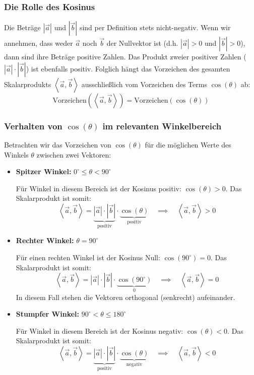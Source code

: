 \subsubsection*{Die Rolle des Kosinus}
Die Beträge $|\vec{a}|$ und $|\vec{b}|$ sind per Definition stets nicht-negativ. Wenn wir annehmen,
dass weder $\vec{a}$ noch $\vec{b}$ der Nullvektor ist (d.h. $|\vec{a}| > 0$ und $|\vec{b}| > 0$), dann
sind ihre Beträge positive Zahlen.
Das Produkt zweier positiver Zahlen ($|\vec{a}| \cdot |\vec{b}|$) ist ebenfalls positiv.
Folglich hängt das Vorzeichen des gesamten Skalarprodukts $\left\langle \vec{a}, \vec{b} \right\rangle$
ausschließlich vom Vorzeichen des Terms $\cos(\theta)$ ab:
$$ \text{Vorzeichen}(\left\langle \vec{a}, \vec{b} \right\rangle) = \text{Vorzeichen}(\cos(\theta)) $$

\subsubsection*{Verhalten von $\cos(\theta)$ im relevanten Winkelbereich}
Betrachten wir das Vorzeichen von $\cos(\theta)$ für die möglichen Werte des Winkels $\theta$ zwischen zwei Vektoren:
\begin{itemize}
    \item \textbf{Spitzer Winkel:} $0^\circ \le \theta < 90^\circ$

          Für Winkel in diesem Bereich ist der Kosinus positiv: $\cos(\theta) > 0$. Das
          Skalarprodukt ist somit: $$ \left\langle \vec{a}, \vec{b} \right\rangle =
              \underbrace{|\vec{a}| \cdot |\vec{b}|}_{\text{positiv}} \cdot
              \underbrace{\cos(\theta)}_{\text{positiv}} \quad \implies \quad \left\langle
              \vec{a}, \vec{b} \right\rangle > 0 $$

    \item \textbf{Rechter Winkel:} $\theta = 90^\circ$

          Für einen rechten Winkel ist der Kosinus Null: $\cos(90^\circ) = 0$. Das
          Skalarprodukt ist somit: $$ \left\langle \vec{a}, \vec{b} \right\rangle =
              |\vec{a}| \cdot |\vec{b}| \cdot \underbrace{\cos(90^\circ)}_{0} \quad \implies
              \quad \left\langle \vec{a}, \vec{b} \right\rangle = 0 $$ In diesem Fall stehen
          die Vektoren orthogonal (senkrecht) aufeinander.

    \item \textbf{Stumpfer Winkel:} $90^\circ < \theta \le 180^\circ$

          Für Winkel in diesem Bereich ist der Kosinus negativ: $\cos(\theta) < 0$. Das
          Skalarprodukt ist somit: $$ \left\langle \vec{a}, \vec{b} \right\rangle =
              \underbrace{|\vec{a}| \cdot |\vec{b}|}_{\text{positiv}} \cdot
              \underbrace{\cos(\theta)}_{\text{negativ}} \quad \implies \quad \left\langle
              \vec{a}, \vec{b} \right\rangle < 0 $$
\end{itemize}

